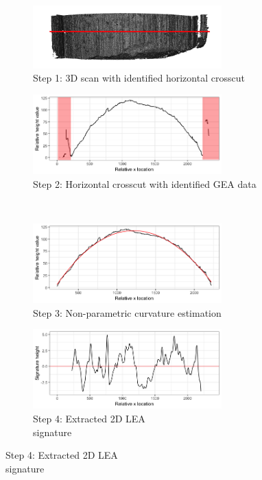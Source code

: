 \documentclass[varwidth]{standalone}
\begin{document}
 
\begin{figure}
  \begin{subfigure}[b]{6cm}
    \centering
    \includegraphics[width=0.8\textwidth]{../images/3d_plot_top_crosscut}
        \captionsetup{justification=centering}
    \caption*{Step 1: 3D scan with identified horizontal crosscut}

  \end{subfigure}
  \hfill
  \begin{subfigure}[b]{6cm}
    \centering
    \includegraphics[width=0.8\textwidth]{../images/profile_paper}
            \captionsetup{justification=centering}
    \caption*{Step 2: Horizontal crosscut with identified GEA data}
  \end{subfigure} \\
  
  \begin{subfigure}[b]{6cm}
    \centering
    \includegraphics[width=0.8\textwidth]{../images/profile_paper_loess}
            \captionsetup{justification=centering}
    \caption*{Step 3: Non-parametric curvature estimation}
  \end{subfigure}
 \hfill
  \begin{subfigure}[b]{6cm}
    \centering
    \includegraphics[width=0.8\textwidth]{../images/signature_paper}
            \captionsetup{justification=centering}
    \caption*{Step 4: Extracted 2D LEA  \\  signature}
  \end{subfigure}
\end{figure}
 
\end{document}
